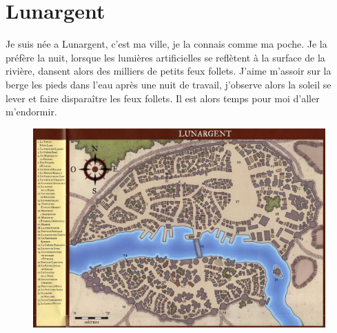 \documentclass[10pt,a4paper,twoside,twocolumn,openany]{book}
\begin{document}
\newpage

\section{Lunargent}

Je suis née a Lunargent, c'est ma ville, je la connais comme ma poche. Je la préfère la nuit, lorsque
les lumières artificielles se reflètent à la surface de la rivière, dansent alors des milliers de petits feux follets. 
J'aime m'assoir sur la berge les pieds dans l'eau après une nuit de travail, j'observe alors la soleil
se lever et faire disparaître les feux follets. Il est alors temps pour moi d'aller m'endormir.

\begin{figure}[!h]
\centering
\includegraphics[width=\textwidth,keepaspectratio]{Map_Lunargent.jpg}
\end{figure}
\end{document}
